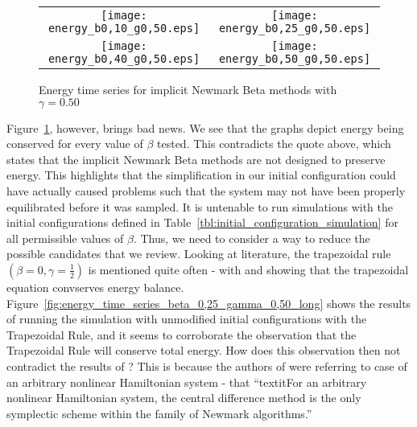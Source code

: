 \documentclass[../Main.tex]{subfiles}
\begin{document}
\begin{figure}[H]
\centering
 	\begin{tabular}{@{}cc@{}}
    		\texttt{[image: energy\_b0,10\_g0,50.eps]} &
    		\texttt{[image: energy\_b0,25\_g0,50.eps]} \\
    		\texttt{[image: energy\_b0,40\_g0,50.eps]} &
    		\texttt{[image: energy\_b0,50\_g0,50.eps]} \\
	\end{tabular}
  	\caption{Energy time series for implicit Newmark Beta methods with $\gamma = 0.50$}
	\label{fig:energy_time_series_gamma_0,50_implicit_beta}
\end{figure} 

Figure~\ref{fig:energy_time_series_gamma_0,50_implicit_beta}, however, brings bad news. We see that the graphs depict energy being conserved for every value of $\beta$ tested. This contradicts the quote above, which states that the implicit Newmark Beta methods are not designed to preserve energy. This highlights that the simplification in our initial configuration could have actually caused problems such that the system may not have been properly equilibrated before it was sampled. It is untenable to run simulations with the initial configurations defined in Table~\ref{tbl:initial_configuration_simulation} for all permissible values of $\beta$.
Thus, we need to consider a way to reduce the possible candidates that we review. Looking at literature, the trapezoidal rule $\left(\beta = 0, \gamma = \frac{1}{2}\right)$ is mentioned quite often - with \cite{DoyenErnPiperno2011} and \cite{Krenk2005} showing that the trapezoidal equation convserves energy balance. Figure~\ref{fig:energy_time_series_beta_0,25_gamma_0,50_long} shows the results of running the simulation with unmodified initial configurations with the Trapezoidal Rule, and it seems to corroborate the observation that the Trapezoidal Rule will conserve total energy. How does this observation then not contradict the results of \cite{SimoTarnowWong1992}? This is because the authors of  \cite{SimoTarnowWong1992} were referring to case of an arbitrary nonlinear Hamiltonian system - that ``textit{For an arbitrary nonlinear Hamiltonian system, the central difference method is the only symplectic scheme within the family of Newmark algorithms.}''
\end{document}
